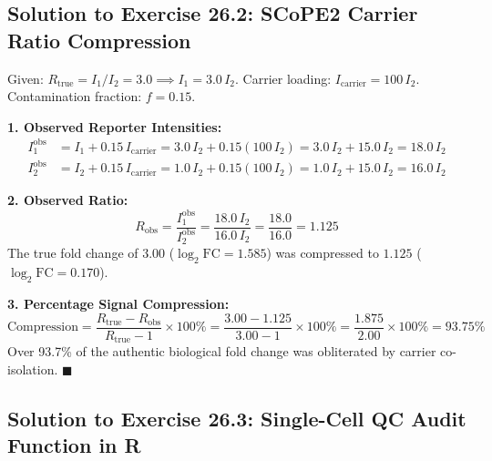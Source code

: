 \documentclass[11pt,twoside,openright]{book}
\begin{document}
\subsection{Solution to Exercise 26.2: SCoPE2 Carrier Ratio Compression}
\label{sec:sol_26_2}

Given: $R_{\text{true}} = I_1 / I_2 = 3.0 \implies I_1 = 3.0 \, I_2$. Carrier loading: $I_{\text{carrier}} = 100 \, I_2$. Contamination fraction: $f = 0.15$.

\textbf{1. Observed Reporter Intensities:}\\
\begin{align}
I_1^{\text{obs}} &= I_1 + 0.15 \, I_{\text{carrier}} = 3.0 \, I_2 + 0.15(100 \, I_2) = 3.0 \, I_2 + 15.0 \, I_2 = 18.0 \, I_2 \\
I_2^{\text{obs}} &= I_2 + 0.15 \, I_{\text{carrier}} = 1.0 \, I_2 + 0.15(100 \, I_2) = 1.0 \, I_2 + 15.0 \, I_2 = 16.0 \, I_2
\end{align}

\textbf{2. Observed Ratio:}\\
\begin{equation}
R_{\text{obs}} = \frac{I_1^{\text{obs}}}{I_2^{\text{obs}}} = \frac{18.0 \, I_2}{16.0 \, I_2} = \frac{18.0}{16.0} = 1.125
\end{equation}
The true fold change of $3.00$ ($\log_2 \text{FC} = 1.585$) was compressed to $1.125$ ($\log_2 \text{FC} = 0.170$).

\textbf{3. Percentage Signal Compression:}\\
\begin{equation}
\text{Compression} = \frac{R_{\text{true}} - R_{\text{obs}}}{R_{\text{true}} - 1} \times 100\% = \frac{3.00 - 1.125}{3.00 - 1} \times 100\% = \frac{1.875}{2.00} \times 100\% = 93.75\%
\end{equation}
Over 93.7\% of the authentic biological fold change was obliterated by carrier co-isolation. \hfill $\blacksquare$

\subsection{Solution to Exercise 26.3: Single-Cell QC Audit Function in R}
\label{sec:sol_26_3}
\end{document}
